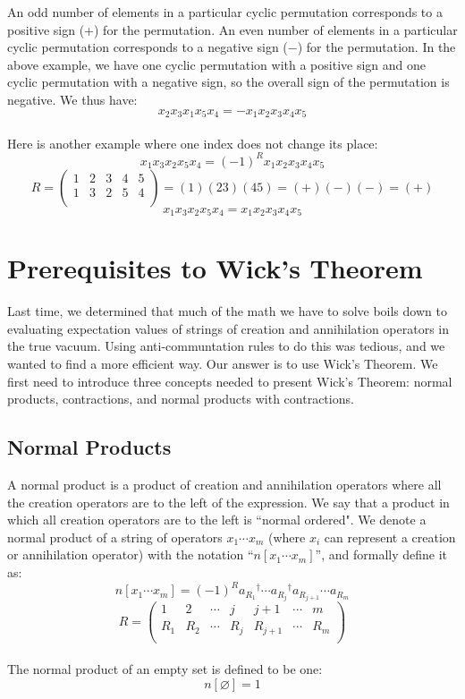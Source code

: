 \documentclass{article}
\newcommand{\dg}{\ensuremath{^\dagger} }
\newcommand{\cd}{\ensuremath{\cdots} }
\begin{document}
An odd number of elements in a particular cyclic permutation corresponds to a positive sign (+) for the permutation.
An even number of elements in a particular cyclic permutation corresponds to a negative sign ($-$) for the permutation. 
In the above example, we have one cyclic permutation with a positive sign and one cyclic permutation with a negative sign, so the overall sign of the permutation is negative.
We thus have: 
\[ x_2 x_3 x_1 x_5 x_4  = -x_1 x_2 x_3 x_4 x_5 \]
\\
Here is another example where one index does not change its place: 
\[ x_1 x_3 x_2 x_5 x_4  = (-1)^R x_1 x_2 x_3 x_4 x_5 \]
\begin{equation*}
R = 
\begin{pmatrix}
1 & 2 &3 & 4 & 5  \\
1 & 3 & 2 & 5 & 4 \\
\end{pmatrix}
= (1)(23)(45) = (+)(-)(-) = (+)
\end{equation*}
\[ x_1 x_3 x_2 x_5 x_4  =  x_1 x_2 x_3 x_4 x_5 \]

\section{Prerequisites to Wick's Theorem}

Last time, we determined that much of the math we have to solve boils down to evaluating expectation values of 
strings of creation and annihilation operators in the true vacuum.
Using anti-communtation rules to do this was tedious, and we wanted to find a more efficient way. 
Our answer is to use Wick's Theorem. 
We first need to introduce three concepts needed to present Wick's Theorem: normal products, contractions, and normal products with contractions.

\subsection{Normal Products}
A normal product is a product of creation and annihilation operators where all the creation operators are to the left of the expression.
We say that a product in which all creation operators are to the left is ``normal ordered". 
We denote a normal product of a string of operators $x_1 \cd x_m$ (where $x_i$ can represent a creation or annihilation operator) with the notation ``$n[x_1 \cd x_m]$'', and formally define it as: 
\[n[x_1 \cd x_m]= (-1)^R a_{R_1}\dg \cd a_{R_j}\dg a_{R_{j+1}} \cd a_{R_m} \]
\[
R = 
\begin{pmatrix}
1 & 2 &\cd & j & j+1 & \cd & m  \\
R_1 & R_2 &\cd & R_j & R_{j+1} & \cd & R_m  \\
\end{pmatrix}
\] \\
The normal product of an empty set is defined to be one:
\[ n[\varnothing] = 1\]
\end{document}
